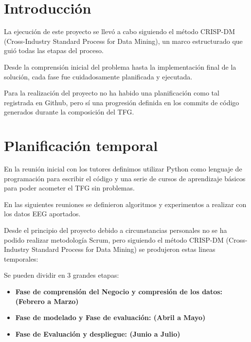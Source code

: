 
\section{Introducción}


La ejecución de este proyecto se llevó a cabo siguiendo el método CRISP-DM (Cross-Industry Standard Process for Data Mining), un marco estructurado que guió todas las etapas del proceso. 

Desde la comprensión inicial del problema hasta la implementación final de la solución, cada fase fue cuidadosamente planificada y ejecutada.

Para la realización del proyecto no ha habido una planificación como tal registrada en Github, pero sí una progresión definida en los commits de código generados durante la composición del TFG.


\section{Planificación temporal}


En la reunión inicial con los tutores definimos utilizar Python como lenguaje de programación para escribir el código y una serie de cursos de aprendizaje básicos para poder acometer el TFG sin problemas.

En las siguientes reuniones se definieron algoritmos y experimentos a realizar con los datos EEG aportados.

Desde el principio del proyecto debido a circunstancias personales no se ha podido realizar metodología Scrum, pero siguiendo el método CRISP-DM (Cross-Industry Standard Process for Data Mining) se produjeron estas lineas temporales:





Se pueden dividir en 3 grandes etapas:

\begin{itemize}
\tightlist
\item
	\textbf{Fase de comprensión del Negocio y compresión de los datos: (Febrero a Marzo)}   	
\item
 	\textbf{Fase de modelado y Fase de evaluación: (Abril a Mayo)} 
\item
	\textbf{Fase de Evaluación y despliegue: (Junio a Julio)} 
\end{itemize}



